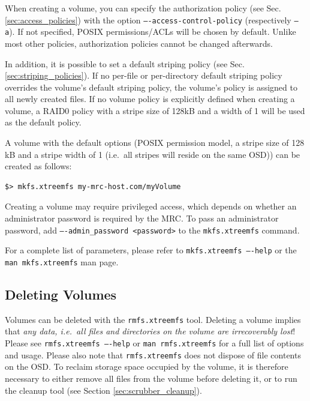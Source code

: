 \documentclass[a4paper,10pt]{book}
\begin{document}
When creating a volume, you can specify the authorization policy (see Sec. \ref{sec:access_policies}) with the option \texttt{----access-control-policy} (respectively \texttt{--a}). If not specified, POSIX permissions/ACLs will be chosen by default. Unlike most other policies, authorization policies cannot be changed afterwards.

In addition, it is possible to set a default striping policy (see Sec. \ref{sec:striping_policies}). If no per-file or per-directory default striping policy overrides the volume's default striping policy, the volume's policy is assigned to all newly created files. If no volume policy is explicitly defined when creating a volume, a RAID0 policy with a stripe size of 128kB and a width of 1 will be used as the default policy.

A volume with the default options (POSIX permission model, a stripe size of 128 kB and a stripe width of 1 (i.e.\ all stripes will reside on the same OSD)) can be created as follows:


\begin{verbatim}
$> mkfs.xtreemfs my-mrc-host.com/myVolume
\end{verbatim}

Creating a volume may require privileged access, which depends on whether an administrator password is required by the MRC. To pass an administrator password, add \texttt{----admin\_password <password>} to the \texttt{mkfs.xtreemfs} command.

For a complete list of parameters, please refer to \texttt{mkfs.xtreemfs ----help} or the \texttt{man mkfs.xtreemfs} man page.

\subsection{Deleting Volumes}

Volumes can be deleted with the \texttt{rmfs.xtreemfs} tool. Deleting a volume implies that \emph{any data, i.e.\ all files and directories on the volume are irrecoverably lost}! Please see \texttt{rmfs.xtreemfs ----help} or \texttt{man rmfs.xtreemfs} for a full list of options and usage. Please also note that \texttt{rmfs.xtreemfs} does not dispose of file contents on the OSD. To reclaim storage space occupied by the volume, it is therefore necessary to either remove all files from the volume before deleting it, or to run the cleanup tool (see Section \ref{sec:scrubber_cleanup}).
\end{document}
